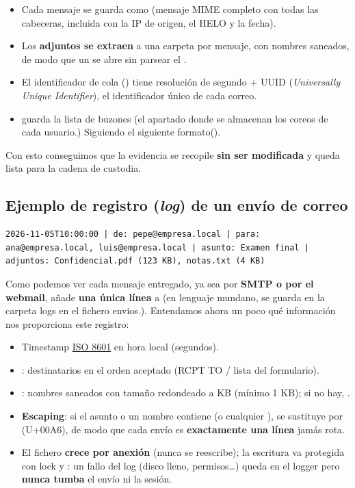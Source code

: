 \begin{itemize}
  \item Cada mensaje se guarda como \textbf{} (mensaje MIME completo
        con todas las cabeceras, incluida  con la IP de origen,
        el HELO y la fecha).
  \item Los \textbf{adjuntos se extraen} a una carpeta por mensaje, con
        nombres saneados, de modo que un  se abre sin parsear el
        .
  \item El identificador de cola () tiene resolución de segundo +
        UUID (\textit{Universally Unique Identifier}), el identificador único de cada correo.
  \item {} guarda la lista de buzones (el apartado donde se almacenan los coreos de cada usuario.) Siguiendo el siguiente formato().
\end{itemize}

Con esto conseguimos que la evidencia se recopile \textbf{sin ser modificada} y queda lista para la cadena de custodia.

\subsection{Ejemplo de registro (\textit{log}) de un envío de correo}
\begin{lstlisting}[style=terminal,breaklines=true]
	2026-11-05T10:00:00 | de: pepe@empresa.local | para: ana@empresa.local, luis@empresa.local | asunto: Examen final | adjuntos: Confidencial.pdf (123 KB), notas.txt (4 KB)
\end{lstlisting}

Como podemos ver cada mensaje entregado, ya sea por \textbf{SMTP o por el webmail}, añade \textbf{una única línea} a  (en lenguaje mundano, se guarda en la carpeta logs en el fichero envios.). 
Entendamos ahora un poco qué información nos proporciona este registro:
\begin{itemize}
	\item Timestamp \href{https://www.iso.org/standard/40130.html}{ISO 8601} en hora local (segundos).
	\item {}: destinatarios en el orden aceptado (RCPT TO / lista del
	formulario).
	\item {}: nombres saneados con tamaño redondeado a KB (mínimo
	1 KB); si no hay, .
	\item \textbf{Escaping}: si el asunto o un nombre contiene \cod{ | } (o
	cualquier \cod{|}), se sustituye por \textbrokenbar{} (U+00A6), de
	modo que cada envío es \textbf{exactamente una línea} jamás rota.
	\item El fichero \textbf{crece por anexión} (nunca se reescribe); la
	escritura va protegida con lock y : un fallo del log
	(disco lleno, permisos\ldots) queda en el logger
	 pero \textbf{nunca tumba} el envío ni la
	sesión.
\end{itemize}


